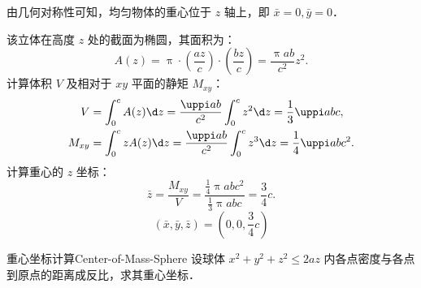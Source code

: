 \begin{solution}
    由几何对称性可知，均匀物体的重心位于 $z$ 轴上，即 $\bar{x} = 0, \bar{y} = 0$．

    该立体在高度 $z$ 处的截面为椭圆，其面积为：
    \begin{equation}\label{eq:area-z}
        A(z) = \uppi \cdot \left( \frac{a z}{c} \right) \cdot \left( \frac{b z}{c} \right) = \frac{\uppi ab}{c^2} z^2.
    \end{equation}
    计算体积 $V$ 及相对于 $xy$ 平面的静矩 $M_{xy}$：
    \begin{equation}\label{eq:v-and-m}
        \begin{aligned}
            V      & = \int_0^c A(z) \d z = \frac{\uppi ab}{c^2} \int_0^c z^2 \d z = \frac{1}{3} \uppi abc,     \\
            M_{xy} & = \int_0^c z A(z) \d z = \frac{\uppi ab}{c^2} \int_0^c z^3 \d z = \frac{1}{4} \uppi abc^2.
        \end{aligned}
    \end{equation}
    计算重心的 $z$ 坐标：
    \begin{equation}\label{eq:z-bar}
        \bar{z} = \frac{M_{xy}}{V} = \frac{\frac{1}{4} \uppi abc^2}{\frac{1}{3} \uppi abc} = \frac{3}{4} c.
    \end{equation}
    \begin{equation}
        \boxed{(\bar{x}, \bar{y}, \bar{z}) = \left( 0, 0, \frac{3}{4} c \right)}
    \end{equation}
\end{solution}

\begin{problem}{重心坐标计算}{Center-of-Mass-Sphere}
    设球体 $x^2 + y^2 + z^2 \leqslant 2az$ 内各点密度与各点到原点的距离成反比，求其重心坐标．
\end{problem}

